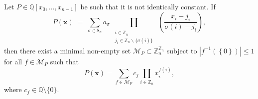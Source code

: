 \begin{lemma}  \label{lem:monomial-support}
 Let $P\in\mathbb{Q}[x_{0},\ldots,x_{n-1}]$ be such that it is not identically
constant. If 
\begin{equation}
P(\mathbf{x})\;=\;\sum_{\sigma\in\text{S}_{n}}a_{\sigma}\prod_{\begin{array}{c}
\substack{i\in\mathbb{Z}_{n}\\
j_{i}\in\mathbb{Z}_{n}\backslash\{\sigma(i)\}
}
\end{array}}\left(\frac{x_{i}-j_{i}}{\sigma(i)-j_{i}}\right),
\end{equation}
then there exist a minimal non-empty set $\mathcal{M}_{P}\subset\mathbb{Z}_{n}^{\mathbb{Z}_{n}}$
subject to $\left|f^{-1}\left(\left\{ 0\right\} \right)\right|\le1$
for all $f\in\mathcal{M}_{P}$ such that 
\begin{equation}
P(\mathbf{x})=\sum_{f\in\mathcal{M}_{P}}c_{f}\prod_{i\in\mathbb{Z}_{n}}x_{i}^{f\left(i\right)},
\end{equation}
where $c_{f}\in\mathbb{Q}\setminus\{0\}$.
\end{lemma}
